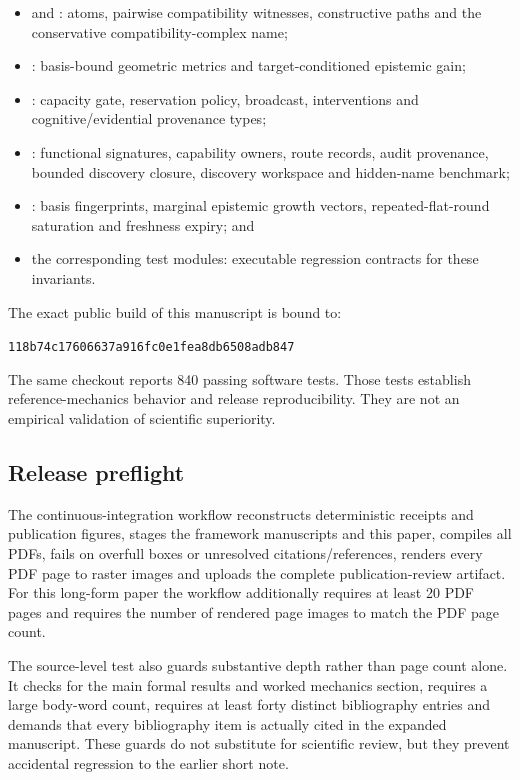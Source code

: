 \documentclass[11pt]{article}
\newcommand{\ImplementationSHA}{\texttt{118b74c17606637a916fc0e1fea8db6508adb847}}
\newcommand{\SoftwareTests}{840}
\begin{document}
\begin{itemize}[leftmargin=*]
\item {} and : atoms, pairwise compatibility witnesses, constructive paths and the conservative compatibility-complex name;
\item {}: basis-bound geometric metrics and target-conditioned epistemic gain;
\item {}: capacity gate, reservation policy, broadcast, interventions and cognitive/evidential provenance types;
\item {}: functional signatures, capability owners, route records, audit provenance, bounded discovery closure, discovery workspace and hidden-name benchmark;
\item {}: basis fingerprints, marginal epistemic growth vectors, repeated-flat-round saturation and freshness expiry; and
\item the corresponding test modules: executable regression contracts for these invariants.
\end{itemize}

The exact public build of this manuscript is bound to:

\begin{center}
\ImplementationSHA
\end{center}

The same checkout reports \SoftwareTests{} passing software tests. Those tests establish reference-mechanics behavior and release reproducibility. They are not an empirical validation of scientific superiority.

\subsection{Release preflight}

The continuous-integration workflow reconstructs deterministic receipts and publication figures, stages the framework manuscripts and this paper, compiles all PDFs, fails on overfull boxes or unresolved citations/references, renders every PDF page to raster images and uploads the complete publication-review artifact. For this long-form paper the workflow additionally requires at least 20 PDF pages and requires the number of rendered page images to match the PDF page count.

The source-level test also guards substantive depth rather than page count alone. It checks for the main formal results and worked mechanics section, requires a large body-word count, requires at least forty distinct bibliography entries and demands that every bibliography item is actually cited in the expanded manuscript. These guards do not substitute for scientific review, but they prevent accidental regression to the earlier short note.
\end{document}
